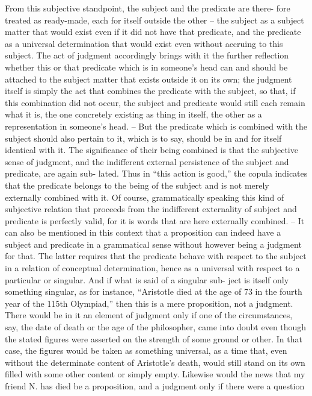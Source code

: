 From this subjective standpoint, the subject and the predicate are there-
fore treated as ready-made, each for itself outside the other – the subject as
a subject matter that would exist even if it did not have that predicate, and
the predicate as a universal determination that would exist even without
accruing to this subject. The act of judgment accordingly brings with it
the further reflection whether this or that predicate which is in someone's
head can and should be attached to the subject matter that exists outside it
on its own; the judgment itself is simply the act that combines the predicate
with the subject, so that, if this combination did not occur, the subject
and predicate would still each remain what it is, the one concretely existing
as thing in itself, the other as a representation in someone's head. – But
the predicate which is combined with the subject should also pertain to it,
which is to say, should be in and for itself identical with it. The significance
of their being combined is that the subjective sense of judgment, and the
indifferent external persistence of the subject and predicate, are again sub-
lated. Thus in “this action is good,” the copula indicates that the predicate
belongs to the being of the subject and is not merely externally combined
with it. Of course, grammatically speaking this kind of subjective relation
that proceeds from the indifferent externality of subject and predicate is
perfectly valid, for it is words that are here externally combined. – It can also
be mentioned in this context that a proposition can indeed have a subject
and predicate in a grammatical sense without however being a judgment
for that. The latter requires that the predicate behave with respect to the
subject in a relation of conceptual determination, hence as a universal with
respect to a particular or singular. And if what is said of a singular sub-
ject is itself only something singular, as for instance, “Aristotle died at the
age of 73 in the fourth year of the 115th Olympiad,” then this is a mere
proposition, not a judgment. There would be in it an element of judgment
only if one of the circumstances, say, the date of death or the age of the
philosopher, came into doubt even though the stated figures were asserted
on the strength of some ground or other. In that case, the figures would be
taken as something universal, as a time that, even without the determinate
content of Aristotle's death, would still stand on its own filled with some
other content or simply empty. Likewise would the news that my friend
N. has died be a proposition, and a judgment only if there were a question
